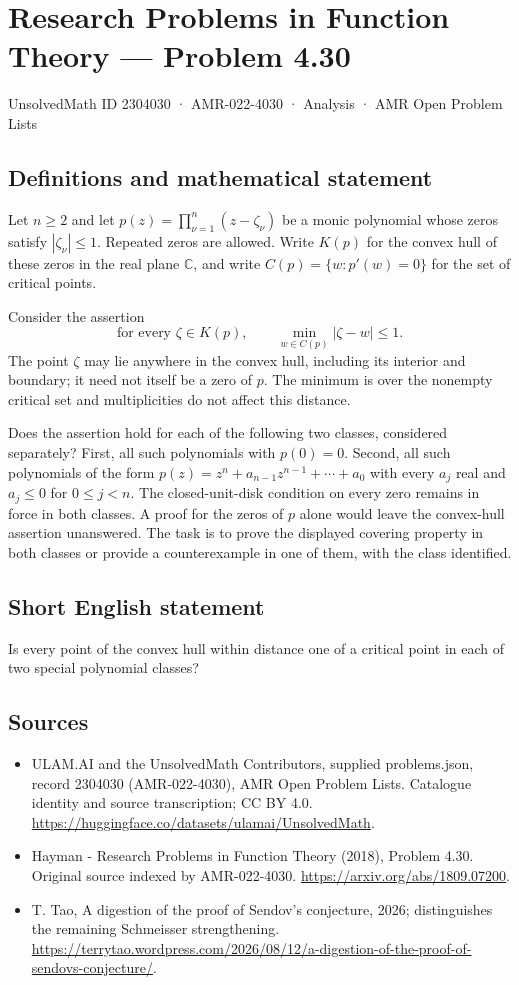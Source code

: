 \documentclass[11pt,a4paper]{article}
\begin{document}
\section*{Research Problems in Function Theory — Problem 4.30}\label{2304030}
{\small UnsolvedMath ID 2304030 · AMR-022-4030 · Analysis · AMR Open Problem Lists}
\subsection{Definitions and mathematical statement}
Let $n\geq2$ and let
$p(z)=\prod_{\nu=1}^{n}(z-\zeta_\nu)$ be a monic polynomial whose
zeros satisfy $|\zeta_\nu|\leq1$. Repeated zeros are allowed.
Write $K(p)$ for the convex hull of these zeros in the real
plane $\mathbb C$, and write $C(p)=\{w:p'(w)=0\}$ for the
set of critical points.

Consider the assertion
\[
 \text{for every }\zeta\in K(p),\qquad
     \min_{w\in C(p)}|\zeta-w|\leq1.
\]
The point $\zeta$ may lie anywhere in the convex hull, including
its interior and boundary; it need not itself be a zero of $p$.
The minimum is over the nonempty critical set and multiplicities
do not affect this distance.

Does the assertion hold for each of the following two classes,
considered separately?
First, all such polynomials with $p(0)=0$.
Second, all such polynomials of the form
$p(z)=z^n+a_{n-1}z^{n-1}+\cdots+a_0$ with every $a_j$ real and
$a_j\leq0$ for $0\leq j<n$.
The closed-unit-disk condition on every zero remains in force
in both classes. A proof for the zeros of $p$ alone would leave
the convex-hull assertion unanswered. The task is to prove the
displayed covering property in both classes or provide a
counterexample in one of them, with the class identified.
\subsection{Short English statement}
Is every point of the convex hull within distance one of a critical point in each of two special polynomial classes?
\subsection{Sources}
\begin{itemize}
\item[S1] ULAM.AI and the UnsolvedMath Contributors, supplied problems.json, record 2304030 (AMR-022-4030), AMR Open Problem Lists. Catalogue identity and source transcription; CC BY 4.0.
\url{https://huggingface.co/datasets/ulamai/UnsolvedMath}.
\item[S2] Hayman - Research Problems in Function Theory (2018), Problem 4.30. Original source indexed by AMR-022-4030.
\url{https://arxiv.org/abs/1809.07200}.
\item[S3] T. Tao, A digestion of the proof of Sendov's conjecture, 2026; distinguishes the remaining Schmeisser strengthening.
\url{https://terrytao.wordpress.com/2026/08/12/a-digestion-of-the-proof-of-sendovs-conjecture/}.
\end{itemize}
\end{document}
